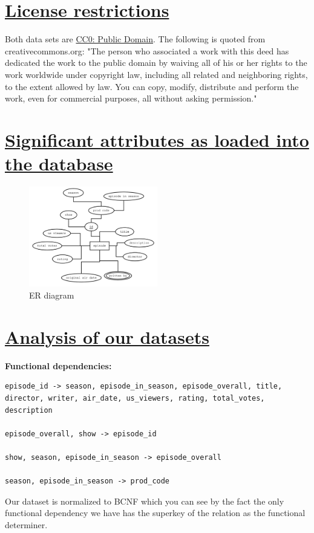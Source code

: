 \documentclass{article}
\begin{document}
\section*{\underline{License restrictions}}
 Both data sets are \href{https://creativecommons.org/publicdomain/zero/1.0/}{CC0: Public Domain}. The following is quoted from creativecommons.org: "The person who associated a work with this deed has dedicated the work to the public domain by waiving all of his or her rights to the work worldwide under copyright law, including all related and neighboring rights, to the extent allowed by law. You can copy, modify, distribute and perform the work, even for commercial purposes, all without asking permission."

\section*{\underline{Significant attributes as loaded into the database}}

\begin{figure}[h]
\centering
\includegraphics[width=0.5\textwidth]{csci403_final_ER}
\caption{ER diagram}
\label{fig:yourlabel}
\end{figure}

\section*{\underline{Analysis of our datasets}}
\textbf{Functional dependencies:}
\begin{verbatim}
episode_id -> season, episode_in_season, episode_overall, title, director, writer, air_date, us_viewers, rating, total_votes, description 

episode_overall, show -> episode_id 

show, season, episode_in_season -> episode_overall 

season, episode_in_season -> prod_code 
\end{verbatim}
Our dataset is normalized to BCNF which you can see by the fact the only functional dependency we have has the superkey of the relation as the functional determiner. 
\end{document}
